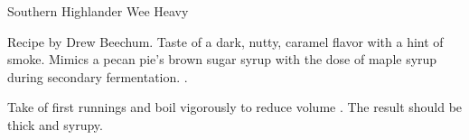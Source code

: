 \begin{recipe}{Southern Highlander Wee Heavy}

\begin{aboutblock}
Recipe by Drew Beechum. Taste of a dark, nutty, caramel flavor with a hint of smoke.
Mimics a pecan pie's brown sugar syrup with the dose of maple syrup during secondary
fermentation. .
\end{aboutblock}


\begin{methodandtiming}

\begin{mashsteps}
\end{mashsteps}

\begin{directions}
Take  of first runnings and boil vigorously to reduce volume
. The result should be thick and syrupy.
\end{directions}

\end{methodandtiming}

\recipebreak

\begin{ingredientsblock}

\begin{malts}
\end{malts}

\begin{hops}
\end{hops}


\begin{twists}
\end{twists}

\end{ingredientsblock}

\end{recipe}

